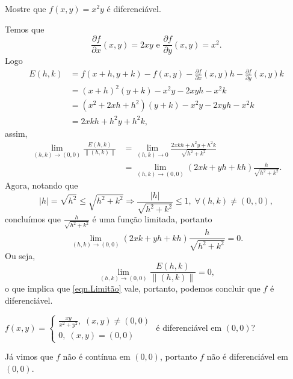 \begin{example}
    Mostre que \(f(x,y) = x^2 y\) é diferenciável.

    Temos que \[\frac{\partial f}{\partial x}(x,y) = 2xy \text{ e } \frac{\partial f}{\partial y}(x,y) = x^2.\] Logo
        \begin{align*}
            E(h,k)
                & = f(x+h,y+k) - f(x,y) - \frac{\partial f}{\partial x}(x,y) h - \frac{\partial f}{\partial y}(x,y) k \\
                & = (x+h)^2(y+k) - x^2 y - 2xyh - x^2k \\
                & = (x^2+2xh+h^2)(y+k) - x^2 y - 2xyh - x^2 k \\
                & = 2xkh + h^2y + h^2 k,
        \end{align*}
    assim,
        \begin{align*}
            \lim_{(h,k)\to(0,0)} \frac{E(h,k)}{\|(h,k)\|}
                & = \lim_{(h,k)\to 0} \frac{2xkh + h^2y + h^2 k}{\sqrt{h^2 + k^2}} \\
                & = \lim_{(h,k)\to(0,0)} (2xk + yh + kh)\frac{h}{\sqrt{h^2 + k^2}}.
        \end{align*}
    Agora, notando que \[|h| = \sqrt{h^2} \leq \sqrt{h^2 + k^2} \Rightarrow \frac{|h|}{\sqrt{h^2 + k^2}} \leq 1,\; \forall (h,k)\neq(0,,0),\] concluímos que \(\frac{h}{\sqrt{h^2 + k^2}}\) é uma função limitada, portanto \[\lim_{(h,k)\to(0,0)} (2xk + yh + kh)\frac{h}{\sqrt{h^2 + k^2}} = 0. \] Ou seja, \[\lim_{(h,k)\to(0,0)} \frac{E(h,k)}{\|(h,k)\|} = 0,\] o que implica que \eqref{eqn.Limitão} vale, portanto, podemos concluir que \(f\) é diferenciável.
\end{example}

\begin{example}
    \(f(x,y) = \begin{cases}
        \frac{xy}{x^2 + y^2},\; (x,y)\neq(0,0) \\
        0,\; (x,y)=(0,0)
    \end{cases}\) é diferenciável em \((0,0)\)?

    Já vimos que \(f\) não é contínua em \((0,0)\), portanto \(f\) não é diferenciável em \((0,0)\).
\end{example}

